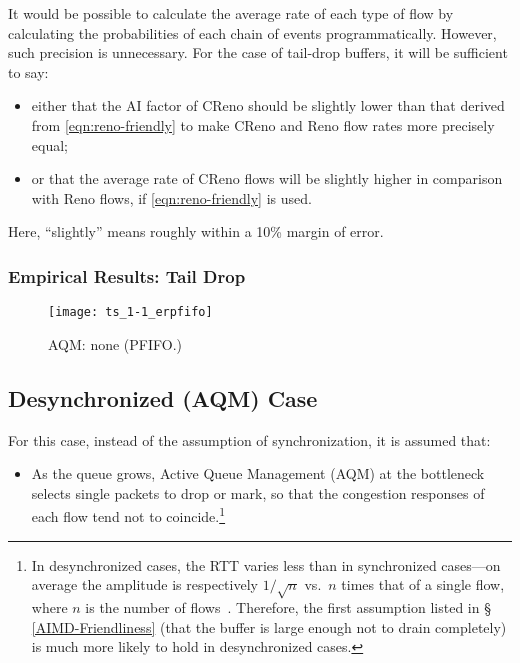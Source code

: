 It would be possible to calculate the average rate of each type of flow by calculating the probabilities of each chain of events programmatically. However, such precision is unnecessary. For the case of tail-drop buffers, it will be sufficient to say:
\begin{itemize}
	\item either that the AI factor of CReno should be slightly lower than that derived from \autoref{eqn:reno-friendly} to make CReno and Reno flow rates more precisely equal;
	\item or that the average rate of CReno flows will be slightly higher in comparison with Reno flows, if \autoref{eqn:reno-friendly} is used.
\end{itemize}
Here, ``slightly''  means roughly within a 10\% margin of error.


\subsubsection{Empirical Results: Tail Drop}\label{empirical-pfifo}

\begin{figure}
	\centering
	\texttt{[image: ts\_1-1\_erpfifo]}
	\caption{AQM: none (PFIFO.)}\label{fig:ts_1-1_erpfifo}
\end{figure}


\subsection{Desynchronized (AQM) Case}\label{AQM}

For this case, instead of the assumption of synchronization, it is assumed that:
\begin{itemize}[nosep]
	\item As the queue grows, Active Queue Management (AQM) at the bottleneck selects single packets to drop or mark, so that the congestion responses of each flow tend not to coincide.\footnote{In desynchronized cases, the RTT varies less than in synchronized cases---on average the amplitude is respectively \(1/\sqrt{n}\) vs.\ \(n\) times that of a single flow, where \(n\) is the number of flows~\cite{Appenzeller04:Sizing_buffers}. Therefore, the first assumption listed in \S\,\ref{AIMD-Friendliness} (that the buffer is large enough not to drain completely) is much more likely to hold in desynchronized cases.}
\end{itemize}

